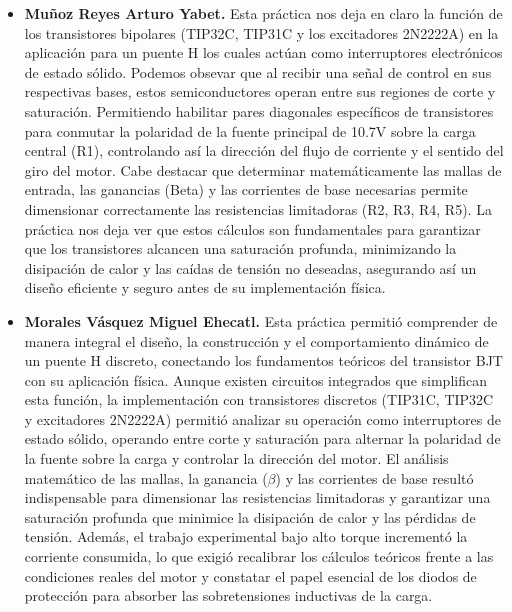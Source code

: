\documentclass[journal]{IEEEtran}
\begin{document}
\begin{itemize}
    \item \textbf{Muñoz Reyes Arturo Yabet.}
    \newline Esta práctica nos deja en claro la función de los transistores bipolares (TIP32C, TIP31C y los excitadores 2N2222A) en la aplicación para un puente H los cuales actúan como interruptores electrónicos de estado sólido. Podemos obsevar que al recibir una señal de control en sus respectivas bases, estos semiconductores operan entre sus regiones de corte y saturación. Permitiendo habilitar pares diagonales específicos de transistores para conmutar la polaridad de la fuente principal de 10.7V sobre la carga central (R1), controlando así la dirección del flujo de corriente y el sentido del giro del motor.
    Cabe destacar que determinar matemáticamente las mallas de entrada, las ganancias (Beta) y las corrientes de base necesarias permite dimensionar correctamente las resistencias limitadoras (R2, R3, R4, R5). La práctica nos deja ver que estos cálculos son fundamentales para garantizar que los transistores alcancen una saturación profunda, minimizando la disipación de calor y las caídas de tensión no deseadas, asegurando así un diseño eficiente y seguro antes de su implementación física.
    \item \textbf{Morales Vásquez Miguel Ehecatl.} 
    \newline Esta práctica permitió comprender de manera integral el diseño, la construcción y el comportamiento dinámico de un puente H discreto, conectando los fundamentos teóricos del transistor BJT con su aplicación física. Aunque existen circuitos integrados que simplifican esta función, la implementación con transistores discretos (TIP31C, TIP32C y excitadores 2N2222A) permitió analizar su operación como interruptores de estado sólido, operando entre corte y saturación para alternar la polaridad de la fuente sobre la carga y controlar la dirección del motor. El análisis matemático de las mallas, la ganancia ($\beta$) y las corrientes de base resultó indispensable para dimensionar las resistencias limitadoras y garantizar una saturación profunda que minimice la disipación de calor y las pérdidas de tensión. Además, el trabajo experimental bajo alto torque incrementó la corriente consumida, lo que exigió recalibrar los cálculos teóricos frente a las condiciones reales del motor y constatar el papel esencial de los diodos de protección para absorber las sobretensiones inductivas de la carga.
\end{itemize}
\end{document}

